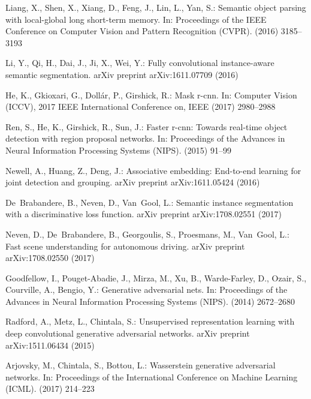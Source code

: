 \documentclass[10pt, letterpaper]{article}
\begin{document}
\begin{thebibliography}{10}
Liang, X., Shen, X., Xiang, D., Feng, J., Lin, L., Yan, S.:
\newblock Semantic object parsing with local-global long short-term memory.
\newblock In: Proceedings of the IEEE Conference on Computer Vision and Pattern
  Recognition (CVPR). (2016)  3185--3193

Li, Y., Qi, H., Dai, J., Ji, X., Wei, Y.:
\newblock Fully convolutional instance-aware semantic segmentation.
\newblock arXiv preprint arXiv:1611.07709 (2016)

He, K., Gkioxari, G., Doll{\'a}r, P., Girshick, R.:
\newblock Mask r-cnn.
\newblock In: Computer Vision (ICCV), 2017 IEEE International Conference on,
  IEEE (2017)  2980--2988

Ren, S., He, K., Girshick, R., Sun, J.:
\newblock Faster r-cnn: Towards real-time object detection with region proposal
  networks.
\newblock In: Proceedings of the Advances in Neural Information Processing
  Systems (NIPS). (2015)  91--99

Newell, A., Huang, Z., Deng, J.:
\newblock Associative embedding: End-to-end learning for joint detection and
  grouping.
\newblock arXiv preprint arXiv:1611.05424 (2016)

De~Brabandere, B., Neven, D., Van~Gool, L.:
\newblock Semantic instance segmentation with a discriminative loss function.
\newblock arXiv preprint arXiv:1708.02551 (2017)

Neven, D., De~Brabandere, B., Georgoulis, S., Proesmans, M., Van~Gool, L.:
\newblock Fast scene understanding for autonomous driving.
\newblock arXiv preprint arXiv:1708.02550 (2017)

Goodfellow, I., Pouget-Abadie, J., Mirza, M., Xu, B., Warde-Farley, D., Ozair,
  S., Courville, A., Bengio, Y.:
\newblock Generative adversarial nets.
\newblock In: Proceedings of the Advances in Neural Information Processing
  Systems (NIPS). (2014)  2672--2680

Radford, A., Metz, L., Chintala, S.:
\newblock Unsupervised representation learning with deep convolutional
  generative adversarial networks.
\newblock arXiv preprint arXiv:1511.06434 (2015)

Arjovsky, M., Chintala, S., Bottou, L.:
\newblock Wasserstein generative adversarial networks.
\newblock In: Proceedings of the International Conference on Machine Learning
  (ICML). (2017)  214--223


\end{thebibliography}
\end{document}
